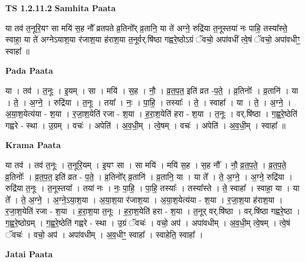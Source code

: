 \documentclass[17pt]{extarticle}
\begin{document}
\textbf{TS 1.2.11.2 } \newline
\textbf{Samhita Paata} \newline

या तव॑ त॒नूरि॒यꣳ सा मयि॑ स॒ह नौ᳚ व्रतपते व्र॒तिनो᳚र् व्र॒तानि॒ या ते॑ अग्ने॒ रुद्रि॑या त॒नूस्तया॑ नः पाहि॒ तस्या᳚स्ते॒ स्वाहा॒ या ते॑ अग्नेऽयाश॒या र॑जाश॒या ह॑राश॒या त॒नूर्वर्.षि॑ष्ठा गह्वरे॒ष्ठोऽग्रं ॅवचो॒ अपा॑वधीं त्वे॒षं ॅवचो॒ अपा॑वधीꣳ॒॒ स्वाहा᳚ ॥ \newline

\textbf{Pada Paata} \newline

या । तव॑ । त॒नूः । इ॒यम् । सा । मयि॑ । स॒ह । नौ॒ । व्र॒त॒प॒त॒ इति॑ व्रत -प॒ते॒ । व्र॒तिनोः᳚ । व्र॒तानि॑ । या । ते॒ । अ॒ग्ने॒ । रुद्रि॑या । त॒नूः । तया᳚ । नः॒ । पा॒हि॒ । तस्याः᳚ । ते॒ । स्वाहा᳚ । या । ते॒ । अ॒ग्ने॒ । अ॒या॒श॒येत्य॑या - श॒या । र॒जा॒श॒येति॑ रजा - श॒या । ह॒रा॒श॒येति॑ हरा - श॒या । त॒नूः । वर्.षि॑ष्ठा । ग॒ह्व॒रे॒ष्ठेति॑ गह्वरे - स्था । उ॒ग्रम् । वचः॑ । अपेति॑ । अ॒व॒धी॒म् । त्वे॒षम् । वचः॑ । अपेति॑ । अ॒व॒धी॒म् । स्वाहा᳚ ॥  \newline


\textbf{Krama Paata} \newline

या तव॑ । तव॑ त॒नूः । त॒नूरि॒यम् । इ॒यꣳ सा । सा मयि॑ । मयि॑ स॒ह । स॒ह नौ᳚ । नौ॒ व्र॒त॒प॒ते॒ । व्र॒त॒प॒ते॒ व्र॒तिनोः᳚ । व्र॒त॒प॒त॒ इति॑ व्रत - प॒ते॒ । व्र॒तिनो᳚र् व्र॒तानि॑ । व्र॒तानि॒ या । या ते᳚ । ते॒ अ॒ग्ने॒ । अ॒ग्ने॒ रुद्रि॑या । रुद्रि॑या त॒नूः । त॒नूस्तया᳚ । तया॑ नः । नः॒ पा॒हि॒ । पा॒हि॒ तस्याः᳚ । तस्या᳚स्ते । ते॒ स्वाहा᳚ । स्वाहा॒ या । या ते᳚ । ते॒ अ॒ग्ने॒ । अ॒ग्ने॒ऽया॒श॒या । अ॒या॒श॒या र॑जाश॒या । अ॒या॒श॒येत्य॑या - श॒या । र॒जा॒श॒या ह॑राश॒या । र॒जा॒श॒येति॑ रजा - श॒या । ह॒रा॒श॒या त॒नूः । ह॒रा॒श॒येति॑ हरा - श॒या । त॒नूर् वर्.षि॑ष्ठा । वर्.षि॑ष्ठा गह्वरे॒ष्ठा । ग॒ह्व॒रे॒ष्ठोग्रम् । ग॒ह्व॒रे॒ष्ठेति॑ गह्वरे - स्था । उ॒ग्रं ॅवचः॑ । वचो॒ अप॑ । अपा॑वधीम् । अ॒व॒धी॒म् त्वे॒षम् । त्वे॒षं ॅवचः॑ । वचो॒ अप॑ । अपा॑वधीम् । अ॒व॒धीꣳ॒॒ स्वाहा᳚ । स्वाहेति॒ स्वाहा᳚ । \newline

\textbf{Jatai Paata} \newline
\end{document}

